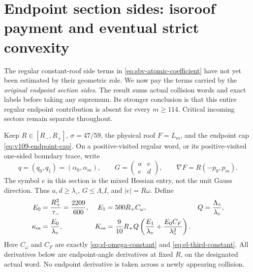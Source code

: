 \section{Endpoint section sides: isoroof payment and eventual strict convexity}
\label{sec:es-isoroof}

The regular constant-roof side terms in
\eqref{eq:sbv-atomic-coefficient} have not yet been estimated by their
geometric role.  We now pay the terms carried by the \emph{original
endpoint section sides}.  The result sums actual collision words and
exact labels before taking any supremum.  Its stronger conclusion is
that this entire regular endpoint contribution is absent for every
$m\ge114$.  Critical incoming sectors remain separate throughout.

Keep $R\in[R_-,R_+]$, $\sigma=47/59$, the physical roof $F=L_m$,
and the endpoint cap \eqref{eq:v109-endpoint-cap}.  On a positive-visited
regular word, or its positive-visited one-sided boundary trace, write
\begin{equation}\label{eq:es-hessian}
 q=(q_0,q_1)=(\alpha_0,\alpha_m),\qquad
 G=\begin{pmatrix}a&e\\e&d\end{pmatrix},\qquad
 \nabla F=R(-p_0,p_m).
\end{equation}
The symbol $e$ in this section is the mixed Hessian entry, not the
unit Gauss direction.  Thus $a,d\ge\lambda_\circ$,
$G\le\Lambda_\circ I$, and $|e|=R\omega$.  Define
\begin{align}
 E_0&=\frac{R_+^2}{\tau_-}=\frac{2209}{600},&
 E_1&=500R_+C_\omega,& Q&=\frac{\Lambda_\circ}{\lambda_\circ},
                                                        \label{eq:es-constants-a}\\
 \kappa_{\rm es}&=\frac{E_0}{\lambda_\circ},&
 K_{\rm es}&=\frac9{10}R_+Q
       \left(\frac{E_1}{\lambda_\circ}
                    +\frac{E_0C_F}{\lambda_\circ^2}\right).
                                                        \label{eq:es-constants-b}
\end{align}
Here $C_\omega$ and $C_F$ are exactly
\eqref{eq:el-omega-constant} and \eqref{eq:el-third-constant}.
All derivatives below are endpoint-angle derivatives at fixed $R$,
on the designated actual word.  No endpoint derivative is taken
across a newly appearing collision.

